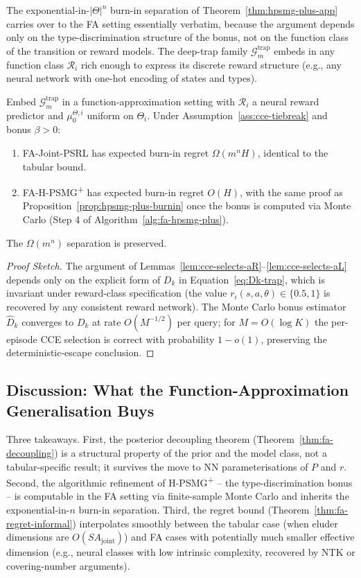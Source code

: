 The exponential-in-$|\Theta|^n$ burn-in separation of Theorem~\ref{thm:hpsmg-plus-app} carries over to the FA setting essentially verbatim, because the argument depends only on the type-discrimination structure of the bonus, not on the function class of the transition or reward models. The deep-trap family $\mathcal{G}_m^{\mathrm{trap}}$ embeds in any function class $\mathcal{R}_i$ rich enough to express its discrete reward structure (e.g., any neural network with one-hot encoding of states and types).

\begin{proposition}
\label{prop:fa-burnin}
Embed $\mathcal{G}_m^{\mathrm{trap}}$ in a function-approximation setting with $\mathcal{R}_i$ a neural reward predictor and $\mu_0^{\Theta, i}$ uniform on $\Theta_i$. Under Assumption~\ref{ass:cce-tiebreak} and bonus $\beta > 0$:
\begin{enumerate}
\item[(i)] FA-Joint-PSRL has expected burn-in regret $\Omega(m^n H)$, identical to the tabular bound.
\item[(ii)] FA-H-PSMG\textsuperscript{+} has expected burn-in regret $O(H)$, with the same proof as Proposition~\ref{prop:hpsmg-plus-burnin} once the bonus is computed via Monte Carlo (Step 4 of Algorithm~\ref{alg:fa-hpsmg-plus}).
\end{enumerate}
The $\Omega(m^n)$ separation is preserved.
\end{proposition}

\begin{proof}[Proof Sketch]
The argument of Lemmas~\ref{lem:cce-selects-aR}--\ref{lem:cce-selects-aL} depends only on the explicit form of $D_k$ in Equation~\eqref{eq:Dk-trap}, which is invariant under reward-class specification (the value $r_i(s, a, \theta) \in \{0.5, 1\}$ is recovered by any consistent reward network). The Monte Carlo bonus estimator $\widehat{D}_k$ converges to $D_k$ at rate $O(M^{-1/2})$ per query; for $M = O(\log K)$ the per-episode CCE selection is correct with probability $1 - o(1)$, preserving the deterministic-escape conclusion.
\end{proof}

\subsection{Discussion: What the Function-Approximation Generalisation Buys}

Three takeaways. First, the posterior decoupling theorem (Theorem~\ref{thm:fa-decoupling}) is a structural property of the prior and the model class, not a tabular-specific result; it survives the move to NN parameterisations of $P$ and $r$. Second, the algorithmic refinement of H-PSMG\textsuperscript{+} -- the type-discrimination bonus -- is computable in the FA setting via finite-sample Monte Carlo and inherits the exponential-in-$n$ burn-in separation. Third, the regret bound (Theorem~\ref{thm:fa-regret-informal}) interpolates smoothly between the tabular case (when eluder dimensions are $O(S A_{\mathrm{joint}})$) and FA cases with potentially much smaller effective dimension (e.g., neural classes with low intrinsic complexity, recovered by NTK or covering-number arguments).

